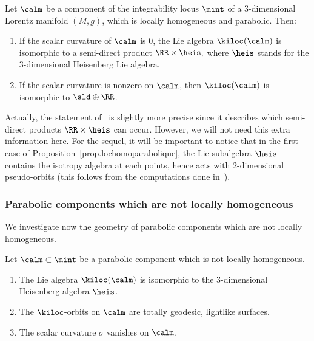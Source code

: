 \begin{prop}\label{prop.lochomoparabolique}
Let $\calm$ be a component of the integrability locus $\mint$ of a $3$-dimensional Lorentz manifold $(M,g)$, which is locally homogeneous and parabolic. Then:
\begin{enumerate}
\item \label{6.2.1} If the scalar curvature of $\calm$ is $0$, the Lie algebra $\kiloc(\calm)$ is isomorphic to a semi-direct product $\RR \ltimes \heis,$ where $\heis$ stands for the $3$-dimensional Heisenberg Lie algebra.
\item \label{6.2.2} If the scalar curvature is nonzero on $\calm$, then $\kiloc(\calm)$ is isomorphic to $\sld \oplus \RR$.
\end{enumerate}
\end{prop}


Actually, the statement of~\cite{frances.open} is slightly more precise since it describes which semi-direct products $\RR \ltimes \heis$ can occur. However, we will not need this extra information here. For the sequel, it will be important to notice that in the first case of Proposition~\ref{prop.lochomoparabolique}, the Lie subalgebra $\heis$ contains the isotropy algebra at each points, hence acts with $2$-dimensional pseudo-orbits (this follows from the computations done in~\cite[Section~4.3.3]{frances.open}).

\subsubsection{Parabolic components which are not locally homogeneous}
We investigate now the geometry of parabolic components which are not locally homogeneous.

\begin{prop}\label{prop.heis}
Let $\calm \subset \mint$ be a parabolic component which is not locally homogeneous.
\begin{enumerate}
\item \label{6.3.1}The Lie algebra $\kiloc(\calm)$ is isomorphic to the $3$-dimensional Heisenberg algebra $\heis$. 
\item \label{6.3.2}The $\kiloc$-orbits on $\calm$ are totally geodesic, lightlike surfaces.
\item \label{6.3.3}The scalar curvature $\sigma$ vanishes on $\calm$.
\end{enumerate}
\end{prop}


